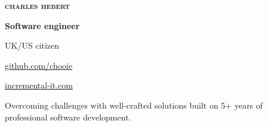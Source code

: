 \begin{center}
  \begin{lsstyle}
    {\Huge \scshape \bfseries charles hebert}
  \end{lsstyle}

  \vspace*{0.5em}

  \textbf{Software engineer}

  UK/US citizen
\end{center}

\begin{small}

\noindent
\begin{minipage}[t]{0.6\textwidth}
\end{minipage}
\noindent
\noindent
\begin{minipage}[t]{0.4\textwidth}
  \begin{description}
    \raggedleft
    \item[My code] \href{http://www.github.com/chooie}{github.com/chooie}
    \item[Website]
      \href{http://incremental-it.com}{incremental-it.com}
  \end{description}
\end{minipage}

\end{small}

\vspace{1.5em}

\noindent
Overcoming challenges with well-crafted solutions built on 5+ years of
professional software development.

\vspace{1.5em}

